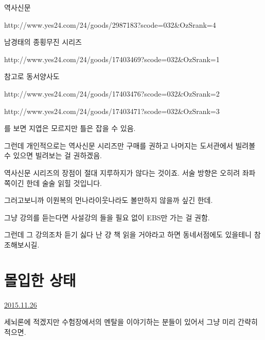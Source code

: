 \vspace{5mm}

역사신문
\vspace{5mm}

http://www.yes24.com/24/goods/2987183?scode=032&OzSrank=4
\vspace{5mm}

남경태의 종횡무진 시리즈
\vspace{5mm}

http://www.yes24.com/24/goods/17403469?scode=032&OzSrank=1
\vspace{5mm}

참고로 동서양사도
\vspace{5mm}

http://www.yes24.com/24/goods/17403476?scode=032&OzSrank=2
\vspace{5mm}

http://www.yes24.com/24/goods/17403471?scode=032&OzSrank=3
\vspace{5mm}

를 보면 지엽은 모르지만 틀은 잡을 수 있음.
\vspace{5mm}

그런데 개인적으로는 역사신문 시리즈만 구매를 권하고 나머지는 도서관에서 빌려볼 수 있으면 빌려보는 걸 권하겠음.
\vspace{5mm}

역사신문 시리즈의 장점이 절대 지루하지가 않다는 것이죠. 서술 방향은 오히려 좌파 쪽이긴 한데 술술 읽힐 것입니다.
\vspace{5mm}

그러고보니까 이원복의 먼나라이웃나라도 볼만하지 않을까 싶긴 한데.
\vspace{5mm}

그냥 강의를 듣는다면 사설강의 들을 필요 없이 EBS만 가는 걸 권함.
\vspace{5mm}

그런데 그 강의조차 듣기 싫다 난 걍 책 읽을 거야라고 하면 동네서점에도 있을테니 참조해보시길.
\vspace{5mm}






\section{몰입한 상태}
\href{https://www.kockoc.com/Apoc/512266}{2015.11.26}

\vspace{5mm}

세뇌론에 적겠지만 수험장에서의 멘탈을 이야기하는 분들이 있어서 그냥 미리 간략히 적으면.
\vspace{5mm}

